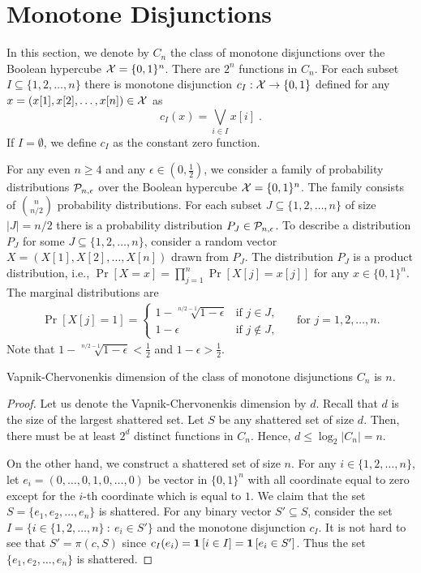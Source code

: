 \section{Monotone Disjunctions}
\label{section:monotone-dijsunctions}

In this section, we denote by $C_n$ the class of monotone disjunctions over the
Boolean hypercube $\X = \{0,1\}^n$. There are $2^n$ functions in $C_n$. For each
subset $I \subseteq \{1,2,\dots,n\}$ there is monotone disjunction $c_I:\X \to
\{0,1\}$ defined for any $x = (x[1],
x[2], \dots, x[n]) \in \X$ as
$$
c_I(x) = \bigvee_{i \in I} x[i] \; .
$$
If $I = \emptyset$, we define $c_I$ as the constant zero function.

For any even $n \ge 4$ and any $\epsilon \in (0,\frac{1}{2})$, we consider a
family of probability distributions $\P_{n,\epsilon}$ over the Boolean hypercube $\X =
\{0,1\}^n$. The family consists of $\binom{n}{n/2}$ probability distributions.
For each subset $J \subseteq \{1,2,\dots,n\}$ of size $|J| = n/2$
there is a probability distribution $P_J \in \P_{n,\epsilon}$. To describe a distribution $P_J$
for some $J \subseteq \{1,2,\dots,n\}$, consider a random vector $X = (X[1],
X[2], \dots, X[n])$ drawn from $P_J$. The distribution $P_J$ is a product
distribution, i.e., $\Pr[X=x] = \prod_{j=1}^n \Pr[X[j] = x[j]]$ for any $x \in
\{0,1\}^n$. The marginal distributions are
\begin{align*}
\Pr[X[j] = 1] =
\begin{cases}
1 - \sqrt[n/2 - 1]{1 - \epsilon}  & \text{if $j \in J$,} \\
1 - \epsilon & \text{if $j \not \in J$,}
\end{cases}
&& \text{for $j=1,2,\dots,n$.}
\end{align*}
Note that $1 - \sqrt[n/2-1]{1 - \epsilon} < \frac{1}{2}$ and $1 - \epsilon > \frac{1}{2}$.

\begin{proposition}
Vapnik-Chervonenkis dimension of the class of monotone disjunctions $C_n$ is $n$.
\end{proposition}

\begin{proof}
Let us denote the Vapnik-Chervonenkis dimension by $d$. Recall that $d$ is the
size of the largest shattered set. Let $S$ be any shattered set of size $d$.
Then, there must be at least $2^d$ distinct functions in $C_n$. Hence, $d \le
\log_2 |C_n| = n$.

On the other hand, we construct a shattered set of size $n$. For any $i \in
\{1,2,\dots,n\}$, let $e_i = (0, \dots, 0, 1, 0, \dots, 0)$ be vector in
$\{0,1\}^n$ with all coordinate equal to zero except for the $i$-th coordinate
which is equal to $1$. We claim that the set $S = \{e_1, e_2, \dots, e_n\}$ is
shattered. For any binary vector $S' \subseteq S$, consider the set $I = \{ i
\in \{1,2,\dots,n\} ~:~ e_i \in S' \}$ and the monotone disjunction $c_I$. It is
not hard to see that $S' = \pi(c, S)$ since $c_I(e_i) = \indicator{i \in I} =
\indicator{e_i \in S'}$. Thus the set $\{e_1, e_2, \dots, e_n\}$ is shattered.
\end{proof}

